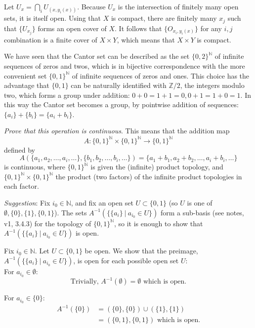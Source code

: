 \documentclass{jhwhw}
\newcommand{\Z}{{\mathbb Z}}
\newcommand{\N}{{\mathbb N}}
\begin{document}
Let $U_x = \bigcap_{i} U_{(x,y_i(x))}$. Because $U_x$ is the intersection of finitely many open sets, it is itself open. Using that $X$ is compact, there are finitely many $x_j$ such that $\{U_{x_j}\}$ forms an open cover of $X$. It follows that $\{O_{x_i,y_i(x)}\}$ for any $i,j$ combination is a finite cover of $X \times Y$, which means that $X \times Y$ is compact.

\problem{}%
We have seen that the Cantor set can be described as the set $\{0,2\}^\N$ of infinite sequences of zeros and twos, which is in bijective correspondence with the more convenient set $\{0,1\}^\N$ of infinite sequences of zeros and ones.  This choice has  the advantage that $\{0,1\}$ can be  naturally identified with $\Z/2$, the integers modulo two, which forms a group under addition:  $ 0 + 0 = 1+ 1 = 0, 0+1 = 1+ 0 = 1$.  In this way the Cantor set becomes a group, by pointwise addition of sequences: $\{a_i\} + \{b_i\} = \{a_i + b_i \}$.  

\emph{ Prove that this operation is continuous}. This means that the  addition  map
$$
A: \{0,1\}^\N\times\{0,1\}^\N \to \{0,1\}^\N 
$$
defined by
$$
A(\{a_1,a_2,\dots, a_i,\dots  \},\{b_1,b_2,\dots, b_i,\dots\})  = \{a_1 + b_1, a_2+b_2,\dots , a_i +b_i,\dots \}
$$
is continuous, where $\{0,1\}^\N$ is given the (infinite) product topology, and $\{0,1\}^\N\times\{0,1\}^\N$ the product (two factors) of the infinite product topologies in each factor.

\emph{Suggestion}:  Fix $i_0\in\N$, and  fix an open set $U\subset \{0,1\}$ (so  $U $ is one of $\emptyset, \{0\}, \{1\},\{0,1\}$).  The sets $A^{-1}(\{ \{a_i\} \ | \ a_{i_0}\in U\})$ form a sub-basis (see notes, v1,  3.4.3)  for the topology of $\{0,1\}^\N$, so it is enough to show that $A^{-1}(\{ \{a_i\} \ | \ a_{i_0}\in U\})$ is open.

\solution{}
Fix $i_0 \in \N$. Let $U \subset \{0,1\}$ be open. We show that the preimage, $A^{-1}(\{ \{a_i\} \ | \ a_{i_0}\in U\})$, is open for each possible open set $U$:
\\

For $a_{i_0}\in \emptyset$:
\begin{equation}
\text{Trivially, } A^{-1}(\emptyset) = \emptyset \text{ which is open.}
\end{equation}

For $a_{i_0}\in \{0\}$: 
\begin{align}A^{-1}(\{0\}) &= (\{0\},\{0\})\cup(\{1\},\{1\}) \\
&= (\{0,1\},\{0,1\}) \text{ which is open.}
\end{align}
\end{document}

